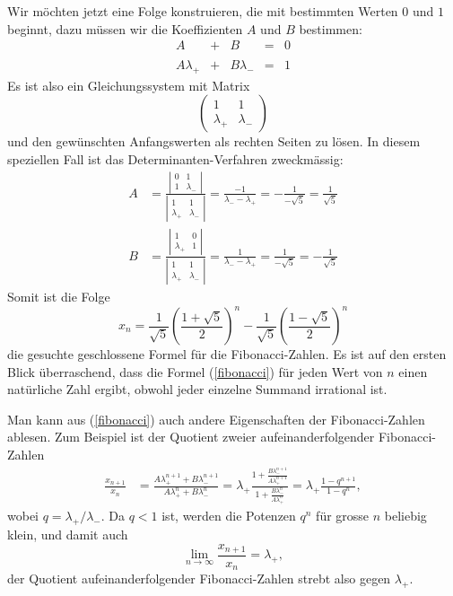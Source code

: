 Wir möchten jetzt eine Folge konstruieren, die mit bestimmten Werten
$0$ und $1$ beginnt, dazu müssen wir die Koeffizienten $A$ und $B$
bestimmen:
\[
\begin{matrix}
A\phantom{\lambda_+}&+&B\phantom{\lambda_-}&=&0
\\
A\lambda_+&+&B\lambda_-&=&1
\end{matrix}
\]
Es ist also ein Gleichungssystem mit Matrix
\[
\begin{pmatrix}
1&1\\\lambda_+&\lambda_-
\end{pmatrix}
\]
und den gewünschten Anfangswerten als rechten Seiten zu lösen.
In diesem speziellen Fall ist das Determinanten-Verfahren zweckmässig:
\begin{align*}
A&=\frac{
\left|
\begin{matrix}
0&1\\1&\lambda_-
\end{matrix}
\right|
}{
\left|
\begin{matrix}
1&1\\\lambda_+&\lambda_-
\end{matrix}
\right|
}
=
\frac{-1}{\lambda_--\lambda_+}=-\frac1{-\sqrt{5}}=\frac1{\sqrt{5}}
\\
B&=\frac{
\left|
\begin{matrix}
1&0\\\lambda_+&1
\end{matrix}
\right|
}{
\left|
\begin{matrix}
1&1\\\lambda_+&\lambda_-
\end{matrix}
\right|
}
=
\frac{1}{\lambda_--\lambda_+}=\frac1{-\sqrt{5}}=-\frac1{\sqrt{5}}
\end{align*}
Somit ist die Folge
\begin{equation}
x_n=\frac1{\sqrt{5}}\left(\frac{1+\sqrt{5}}{2}\right)^n
-\frac1{\sqrt{5}}\left(\frac{1-\sqrt{5}}{2}\right)^n
\label{fibonacci}
\end{equation}
die gesuchte geschlossene Formel für die Fibonacci-Zahlen.
Es ist auf den ersten Blick überraschend, dass die Formel
(\ref{fibonacci}) für jeden Wert von $n$ einen natürliche
Zahl ergibt, obwohl jeder einzelne Summand irrational ist.

Man kann aus (\ref{fibonacci}) auch andere Eigenschaften der
Fibonacci-Zahlen ablesen.
Zum Beispiel ist der Quotient zweier aufeinanderfolgender Fibonacci-Zahlen
\begin{align*}
\frac{x_{n+1}}{x_n}
&=
\frac{A\lambda_+^{n+1}+B\lambda_-^{n+1}}{A\lambda_+^{n}+B\lambda_-^{n}}
=
\lambda_+\frac{1+\displaystyle\frac{B\lambda_-^{n+1}}{A\lambda_+^{n+1}}}{1+\displaystyle\frac{B\lambda_-^n}{A\lambda_+^n}}
=
\lambda_+\frac{1-q^{n+1}}{1-q^n},
\end{align*}
wobei $q=\lambda_+/\lambda_-$.
Da $q<1$ ist, werden die Potenzen $q^n$ für grosse $n$ beliebig klein,
und damit auch
\[
\lim_{n\to\infty}\frac{x_{n+1}}{x_n}=\lambda_+,
\]
der Quotient aufeinanderfolgender Fibonacci-Zahlen strebt also gegen
$\lambda_+$.

